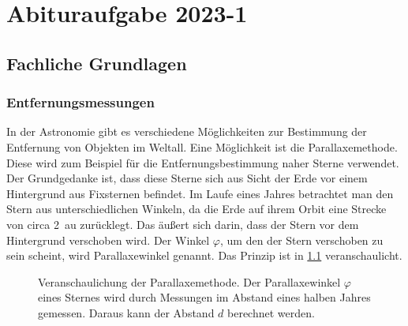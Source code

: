 \chapter{Abituraufgabe 2023-1}\label{aufg:2023-1}

\section{Fachliche Grundlagen}

\subsection{Entfernungsmessungen}
\label{chap:Entfernung}
In der Astronomie gibt es verschiedene Möglichkeiten zur Bestimmung der Entfernung von Objekten im Weltall. Eine Möglichkeit ist die Parallaxemethode. Diese wird zum Beispiel für die Entfernungsbestimmung naher Sterne verwendet. Der Grundgedanke ist, dass diese Sterne sich aus Sicht der Erde vor einem Hintergrund aus Fixsternen befindet. Im Laufe eines Jahres betrachtet man den Stern aus unterschiedlichen Winkeln, da die Erde auf ihrem Orbit eine Strecke von circa \SI{2}{\astronomicalunit} zurücklegt. Das äußert sich darin, dass der Stern vor dem Hintergrund verschoben wird.
Der Winkel $\varphi$, um den der Stern verschoben zu sein scheint, wird Parallaxewinkel genannt. Das Prinzip ist in \cref{fig:Parallaxe} veranschaulicht. 
\begin{figure}
	\centering
	\caption{Veranschaulichung der Parallaxemethode. Der Parallaxewinkel $\varphi$ eines Sternes wird durch Messungen im Abstand eines halben Jahres gemessen. Daraus kann der Abstand $d$ berechnet werden.}
	\label{fig:Parallaxe}
\end{figure}
